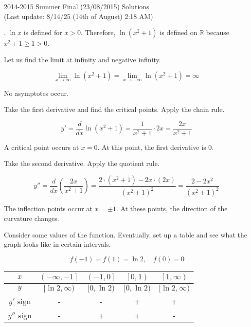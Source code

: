 \documentclass{article}
\begin{document}
\newpage

\begin{center}
2014-2015 Summer Final (23/08/2015) Solutions\\
(Last update: 8/14/25 (14th of August) 2:18 AM)
\end{center}

. $\ln x$ is defined for $x>0$. Therefore, $\ln\left(x^2+1\right)$ is defined on $\mathbb{R}$ because $x^2+1\geq1>0$.

\hfill

\noindent Let us find the limit at infinity and negative infinity.

\begin{equation*}\lim_{x\to\infty}\ln\left(x^2+1\right)=\lim_{x\to-\infty}\ln\left(x^2+1\right)=\infty\end{equation*}

\hfill

\noindent No asymptotes occur.

\hfill

\noindent Take the first derivative and find the critical points. Apply the chain rule.

\[y'=\frac d{dx}\ln\left(x^2+1\right)=\frac1{x^2+1}\cdot 2x=\frac{2x}{x^2+1}\]

\hfill

\noindent A critical point occurs at $x=0$. At this point, the first derivative is $0$.

\hfill

\noindent Take the second derivative. Apply the quotient rule.

\[y''=\frac d{dx}\left(\frac{2x}{x^2+1}\right)=\frac{2\cdot\left(x^2+1\right)-2x\cdot(2x)}{\left(x^2+1\right)^2}=\frac{2-2x^2}{\left(x^2+1\right)^2}\]

\hfill

\noindent The inflection points occur at $x=\pm1$. At these points, the direction of the curvature changes.

\hfill

\noindent Consider some values of the function. Eventually, set up a table and see what the graph looks like in certain intervals.

\begin{equation*}\,f\left(-1\right)=f\left(1\right)=\ln2,\quad f(0)=0\end{equation*}

\begin{center}
    \large
    \begin{tabular}{|c|cccc|} 
    \hline
        $x$&$\left(-\infty,-1\right]$&$\left(-1,0\right]$&$\left[0,1\right)$&$\left[1, \infty\right)$\\
        \hline
        $y$&$[\ln2,\infty)$&$[0,\ln2)$&$[0,\ln2)$&$[\ln2,\infty)$\\
        \hline
        $y'$ sign&-&-&+&+\\
        \hline
        $y''$ sign&-&+&+&-\\
        \hline
    \end{tabular}
\end{center}
\end{document}
